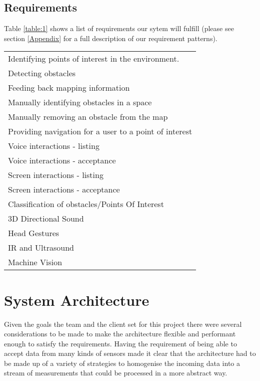 \documentclass[prodmode,acmtosem]{acmsmall} %
\begin{document}
\subsection{Requirements}

Table \ref{table:1} shows a list of requirements our sytem will fulfill (please see section \ref{Appendix} for a full description of our requirement patterns).\\

\renewcommand{\arraystretch}{1.5}
\centering
\begin{tabular}{| l ||} 
 \hline
 \rowcolor{lightgray}\multicolumn{1}{c}{List of Requirements} \\ [0.5ex] 
 \hline\hline
 Identifying points of interest in the environment. \\ 
 \hline
 Detecting obstacles \\
 \hline
 Feeding back mapping information \\
 \hline
 Manually identifying obstacles in a space \\
 \hline
 Manually removing an obstacle from the map \\ 
 \hline
 Providing navigation for a user to a point of interest \\ 
 \hline
 Voice interactions - listing \\ 
 \hline
 Voice interactions - acceptance \\ 
 \hline
 Screen interactions - listing \\ 
 \hline
 Screen interactions - acceptance \\ 
 \hline
 Classification of obstacles/Points Of Interest \\ 
 \hline
 3D Directional Sound \\ 
 \hline
 Head Gestures \\ 
 \hline
 IR and Ultrasound \\ 
 \hline
 Machine Vision \\ 
 \hline
\end{tabular}
\label{table:1}

\section{System Architecture}
\label{architecture}
Given the goals the team and the client set for this project there were several considerations to be made to make the architecture flexible and performant enough to satisfy the requirements. Having the requirement of being able to accept data from many kinds of sensors made it clear that the architecture had to be made up of a variety of strategies to homogenise the incoming data into a stream of measurements that could be processed in a more abstract way.
\end{document}
